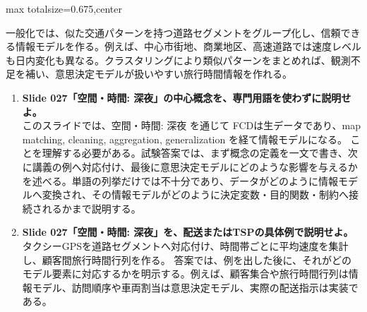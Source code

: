 \begin{adjustbox}{max totalsize={\textwidth}{0.675\textheight},center}
\begin{minipage}{\textwidth}
\begin{minipage}[t]{0.485\textwidth}
一般化では、似た交通パターンを持つ道路セグメントをグループ化し、信頼できる情報モデルを作る。例えば、中心市街地、商業地区、高速道路では速度レベルも日内変化も異なる。クラスタリングにより類似パターンをまとめれば、観測不足を補い、意思決定モデルが扱いやすい旅行時間情報を作れる。\par
{}
\begin{enumerate}
\item \textbf{Slide 027「空間・時間: 深夜」の中心概念を、専門用語を使わずに説明せよ。}\\このスライドでは、空間・時間: 深夜 を通じて FCDは生データであり、map matching, cleaning, aggregation, generalization を経て情報モデルになる。 ことを理解する必要がある。試験答案では、まず概念の定義を一文で書き、次に講義の例へ対応付け、最後に意思決定モデルにどのような影響を与えるかを述べる。単語の列挙だけでは不十分であり、データがどのように情報モデルへ変換され、その情報モデルがどのように決定変数・目的関数・制約へ接続されるかまで説明する。
\item \textbf{Slide 027「空間・時間: 深夜」を、配送またはTSPの具体例で説明せよ。}\\タクシーGPSを道路セグメントへ対応付け、時間帯ごとに平均速度を集計し、顧客間旅行時間行列を作る。 答案では、例を出した後に、それがどのモデル要素に対応するかを明示する。例えば、顧客集合や旅行時間行列は情報モデル、訪問順序や車両割当は意思決定モデル、実際の配送指示は実装である。
\end{enumerate}
\end{minipage}
\end{minipage}
\end{adjustbox}


